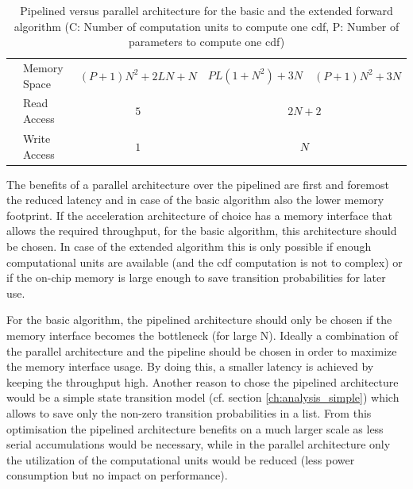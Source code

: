 \documentclass[mscthesis]{usiinfthesis}
\begin{document}
\begin{table}
\begin{center}
\begin{tabular}{|c|l|*{3}{c|}}
            \cline{2-5}
            & Memory Space
            & $(P+1)N^2+2LN+N$
            & $PL(1+N^2)+3N$ & $(P+1)N^2+3N$
            \\
            \cline{2-5}
            & Read Access
            & $5$
            & \multicolumn{2}{c|}{$2N+2$}
            \\
            \cline{2-5}
            & Write Access
            & $1$
            & \multicolumn{2}{c|}{$N$}
            \\
            \hline
        \end{tabular}
    \end{center}
    \caption{Pipelined versus parallel architecture for the basic and the
        extended forward algorithm (C: Number of computation units to compute
        one \acrshort{cdf}, P: Number of parameters to compute one
        \acrshort{cdf})}
    \label{tab:summary_D}
\end{table}

The benefits of a parallel architecture over the pipelined are first and
foremost the reduced latency and in case of the basic algorithm also the lower
memory footprint. If the acceleration architecture of choice has a memory
interface that allows the required throughput, for the basic algorithm, this
architecture should be chosen. In case of the extended algorithm this is only
possible if enough computational units are available (and the \gls{cdf} computation
is not to complex) or if the on-chip memory is large enough to save transition
probabilities for later use.

For the basic algorithm, the pipelined architecture should only be chosen if
the memory interface becomes the bottleneck (for large N). Ideally
a combination of the parallel architecture and the pipeline should be chosen in
order to maximize the memory interface usage. By doing this, a smaller latency
is achieved by keeping the throughput high. Another reason to chose the
pipelined architecture would be a simple state transition model (cf. section
\ref{ch:analysis_simple}) which allows to save only the non-zero transition
probabilities in a list. From this optimisation the pipelined architecture
benefits on a much larger scale as less serial accumulations would be
necessary, while in the parallel architecture only the utilization of the
computational units would be reduced (less power consumption but no impact on
performance).
\end{document}
